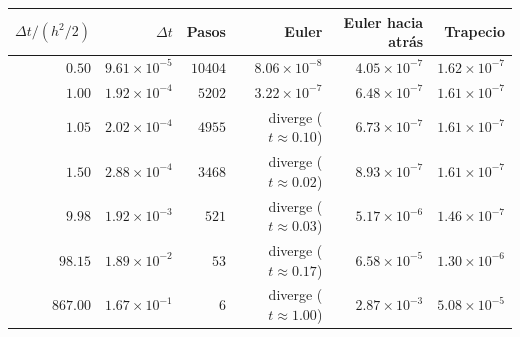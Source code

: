 \begin{tabular}{r r r r r r}
\toprule
\rowcolor{Azul1!50}
$\Delta t/(h^2/2)$ & $\Delta t$ & Pasos & Euler & Euler hacia atrás & Trapecio \\
\midrule
$0.50$ & $9.61\times10^{-5}$ & $10404$ & $8.06\times10^{-8}$ & $4.05\times10^{-7}$ & $1.62\times10^{-7}$ \\
$1.00$ & $1.92\times10^{-4}$ & $5202$ & $3.22\times10^{-7}$ & $6.48\times10^{-7}$ & $1.61\times10^{-7}$ \\
$1.05$ & $2.02\times10^{-4}$ & $4955$ & diverge ($t\approx0.10$) & $6.73\times10^{-7}$ & $1.61\times10^{-7}$ \\
$1.50$ & $2.88\times10^{-4}$ & $3468$ & diverge ($t\approx0.02$) & $8.93\times10^{-7}$ & $1.61\times10^{-7}$ \\
$9.98$ & $1.92\times10^{-3}$ & $521$ & diverge ($t\approx0.03$) & $5.17\times10^{-6}$ & $1.46\times10^{-7}$ \\
$98.15$ & $1.89\times10^{-2}$ & $53$ & diverge ($t\approx0.17$) & $6.58\times10^{-5}$ & $1.30\times10^{-6}$ \\
$867.00$ & $1.67\times10^{-1}$ & $6$ & diverge ($t\approx1.00$) & $2.87\times10^{-3}$ & $5.08\times10^{-5}$ \\
\bottomrule
\end{tabular}
